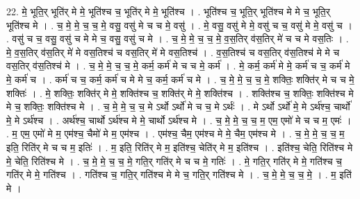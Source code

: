 \documentclass[17pt]{extarticle}
\begin{document}
22. मे॒ भूति॒र् भूति॑र् मे मे॒ भूति॑श्च च॒ भूति॑र् मे मे॒ भूति॑श्च । . भूति॑श्च च॒ भूति॒र् भूति॑श्च मे मे च॒ भूति॒र् भूति॑श्च मे । . च॒ मे॒ मे॒ च॒ च॒ मे॒ वसु॒ वसु॑ मे च च मे॒ वसु॑ । . मे॒ वसु॒ वसु॑ मे मे॒ वसु॑ च च॒ वसु॑ मे मे॒ वसु॑ च । . वसु॑ च च॒ वसु॒ वसु॑ च मे मे च॒ वसु॒ वसु॑ च मे । . च॒ मे॒ मे॒ च॒ च॒ मे॒ व॒स॒तिर् व॑स॒तिर् मे॑ च च मे वस॒तिः । . मे॒ व॒स॒तिर् व॑स॒तिर् मे॑ मे वस॒तिश्च॑ च वस॒तिर् मे॑ मे वस॒तिश्च॑ । . व॒स॒तिश्च॑ च वस॒तिर् व॑स॒तिश्च॑ मे मे च वस॒तिर् व॑स॒तिश्च॑ मे । . च॒ मे॒ मे॒ च॒ च॒ मे॒ कर्म॒ कर्म॑ मे च च मे॒ कर्म॑ । . मे॒ कर्म॒ कर्म॑ मे मे॒ कर्म॑ च च॒ कर्म॑ मे मे॒ कर्म॑ च । . कर्म॑ च च॒ कर्म॒ कर्म॑ च मे मे च॒ कर्म॒ कर्म॑ च मे । . च॒ मे॒ मे॒ च॒ च॒ मे॒ शक्तिः॒ शक्ति॑र् मे च च मे॒ शक्तिः॑ । . मे॒ शक्तिः॒ शक्ति॑र् मे मे॒ शक्ति॑श्च च॒ शक्ति॑र् मे मे॒ शक्ति॑श्च । . शक्ति॑श्च च॒ शक्तिः॒ शक्ति॑श्च मे मे च॒ शक्तिः॒ शक्ति॑श्च मे । . च॒ मे॒ मे॒ च॒ च॒ मे ऽर्थो ऽर्थो॑ मे च च॒ मे ऽर्थः॑ । . मे ऽर्थो ऽर्थो॑ मे॒ मे ऽर्थ॑श्च॒ चार्थो॑ मे॒ मे ऽर्थ॑श्च । . अर्थ॑श्च॒ चार्थो ऽर्थ॑श्च मे मे॒ चार्थो ऽर्थ॑श्च मे । . च॒ मे॒ मे॒ च॒ च॒ म॒ एम॒ एमो॑ मे च च म॒ एमः॑ । . म॒ एम॒ एमो॑ मे म॒ एम॑श्च॒ चैमो॑ मे म॒ एम॑श्च । . एम॑श्च॒ चैम॒ एम॑श्च मे मे॒ चैम॒ एम॑श्च मे । . च॒ मे॒ मे॒ च॒ च॒ म॒ इति॒ रिति॑र् मे च च म॒ इतिः॑ । . म॒ इति॒ रिति॑र् मे म॒ इति॑श्च॒ चेति॑र् मे म॒ इति॑श्च । . इति॑श्च॒ चेति॒ रिति॑श्च मे मे॒ चेति॒ रिति॑श्च मे । . च॒ मे॒ मे॒ च॒ च॒ मे॒ गति॒र् गति॑र् मे च च मे॒ गतिः॑ । . मे॒ गति॒र् गति॑र् मे मे॒ गति॑श्च च॒ गति॑र् मे मे॒ गति॑श्च । . गति॑श्च च॒ गति॒र् गति॑श्च मे मे च॒ गति॒र् गति॑श्च मे । . च॒ मे॒ मे॒ च॒ च॒ मे॒ । . म॒ इति॑ मे । \newline
\pagebreak
{}
\end{document}
